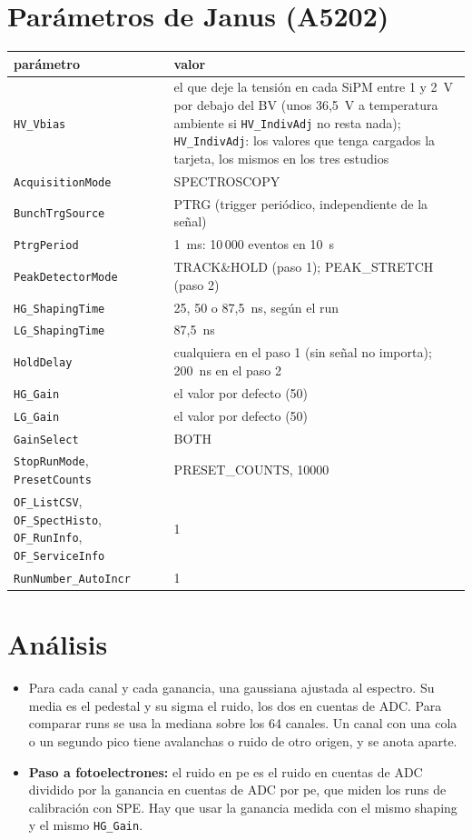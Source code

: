 \documentclass[11pt,a4paper]{article}
\begin{document}
\section{Parámetros de Janus (A5202)}
\label{sec:janus}

\begin{center}
\small
\begin{tabular}{p{} p{}}
\hline
parámetro & valor \\
\hline
\texttt{HV\_Vbias} & el que deje la tensión en cada SiPM entre 1 y 2~V por
debajo del BV (unos 36,5~V a temperatura ambiente si \texttt{HV\_IndivAdj}
no resta nada); \texttt{HV\_IndivAdj}: los valores que tenga cargados
la tarjeta, los mismos en los tres estudios \\
\texttt{AcquisitionMode} & SPECTROSCOPY \\
\texttt{BunchTrgSource} & PTRG (trigger periódico, independiente de la señal) \\
\texttt{PtrgPeriod} & 1~ms: 10\,000 eventos en 10~s \\
\texttt{PeakDetectorMode} & TRACK\&HOLD (paso 1); PEAK\_STRETCH (paso 2) \\
\texttt{HG\_ShapingTime} & 25, 50 o 87,5~ns, según el run \\
\texttt{LG\_ShapingTime} & 87,5~ns \\
\texttt{HoldDelay} & cualquiera en el paso 1 (sin señal no importa); 200~ns en el paso 2 \\
\texttt{HG\_Gain} & el valor por defecto (50) \\
\texttt{LG\_Gain} & el valor por defecto (50) \\
\texttt{GainSelect} & BOTH \\
\texttt{StopRunMode}, \texttt{PresetCounts} & PRESET\_COUNTS, 10000 \\
\texttt{OF\_ListCSV}, \texttt{OF\_SpectHisto}, \texttt{OF\_RunInfo},
\texttt{OF\_ServiceInfo} & 1 \\
\texttt{RunNumber\_AutoIncr} & 1 \\
\hline
\end{tabular}
\end{center}

\section{Análisis}
\label{sec:datos}

\begin{itemize}
\item Para cada canal y cada ganancia, una gaussiana
  ajustada al espectro. Su media es el pedestal y su sigma el ruido, los
  dos en cuentas de ADC. Para comparar runs se usa la mediana sobre los 64
  canales. Un canal con una cola o un segundo pico tiene avalanchas o
  ruido de otro origen, y se anota aparte.
\item {\bf Paso a fotoelectrones:} el ruido en pe es el ruido en cuentas de
  ADC dividido por la ganancia en cuentas de ADC por pe, que miden los
  runs de calibración con SPE. Hay que usar la ganancia medida con el mismo
  shaping y el mismo \texttt{HG\_Gain}.
\end{itemize}
\end{document}
